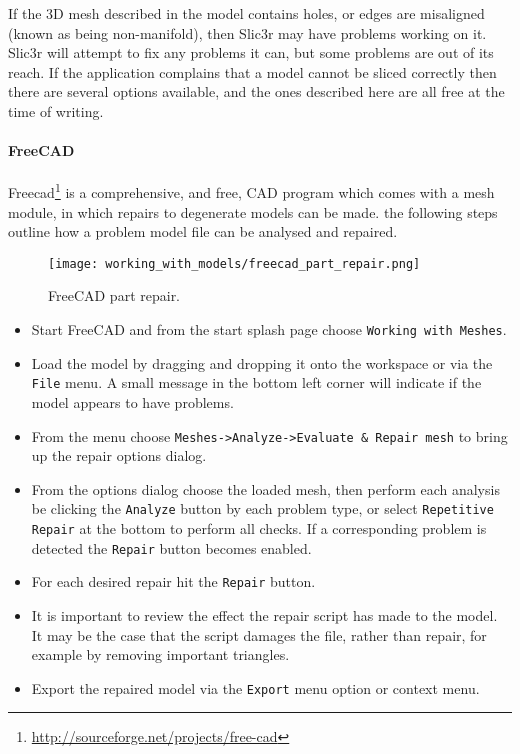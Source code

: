 
If the 3D mesh described in the model contains holes, or edges are misaligned (known as being non-manifold), then Slic3r may have problems working on it.  Slic3r will attempt to fix any problems it can, but some problems are out of its reach.  If the application complains that a model cannot be sliced correctly then there are several options available, and the ones described here are all free at the time of writing.

{}

\paragraph{FreeCAD} %
\label{par:freecad}

Freecad\footnote{\url{http://sourceforge.net/projects/free-cad}} is a comprehensive, and free, CAD program which comes with a mesh module, in which repairs to degenerate models can be made.  the following steps outline how a problem model file can be analysed and repaired.

\begin{figure}[H]
\centering
\texttt{[image: working\_with\_models/freecad\_part\_repair.png]}
\caption{FreeCAD part repair.}
\label{fig:freecad_part_repair}
\end{figure}

\begin{itemize}
	\item Start FreeCAD and from the start splash page choose \texttt{Working with Meshes}.
	\item Load the model by dragging and dropping it onto the workspace or via the \texttt{File} menu.  A small message in the bottom left corner will indicate if the model appears to have problems.
	\item From the menu choose \texttt{Meshes->Analyze->Evaluate \& Repair mesh} to bring up the repair options dialog.
	\item From the options dialog choose the loaded mesh, then perform each analysis be clicking the \texttt{Analyze} button by each problem type, or select \texttt{Repetitive Repair} at the bottom to perform all checks.  If a corresponding problem is detected the \texttt{Repair} button becomes enabled.
	\item For each desired repair hit the \texttt{Repair} button.
	\item It is important to review the effect the repair script has made to the model.  It may be the case that the script damages the file, rather than repair, for example by removing important triangles.
	\item Export the repaired model via the \texttt{Export} menu option or context menu.
\end{itemize}
